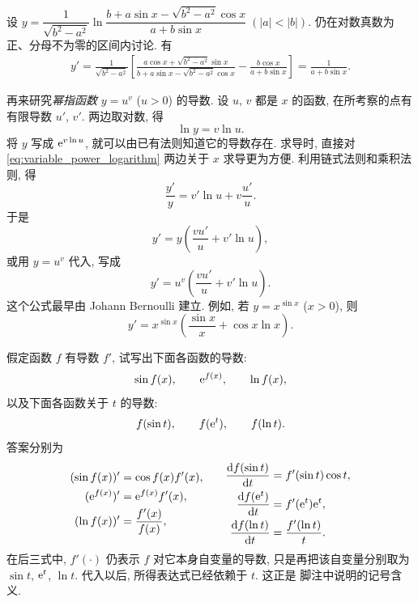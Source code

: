 \label{ex:differentiate_log_fractional_sine}
设
$
y=\dfrac1{\sqrt{b^2-a^2}}
\ln\dfrac{b+a\sin x-\sqrt{b^2-a^2}\cos x}{a+b\sin x}\; (|a|<|b|).
$
仍在对数真数为正、分母不为零的区间内讨论. 有
\begin{align*}
y'=\frac1{\sqrt{b^2-a^2}}\left[
\frac{a\cos x+\sqrt{b^2-a^2}\sin x}
{b+a\sin x-\sqrt{b^2-a^2}\cos x}
-\frac{b\cos x}{a+b\sin x}\right]
=\frac1{a+b\sin x}.
\end{align*}

\label{ex:differentiate_variable_power}
再来研究\emph{幂指函数}
 $y=u^v$ ($u>0$) 的导数.
设 $u$, $v$ 都是 $x$ 的函数, 在所考察的点有有限导数 $u'$, $v'$.
两边取对数, 得
\begin{equation}\label{eq:variable_power_logarithm}
\ln y=v\ln u.
\end{equation}
将 $y$ 写成 $\mathrm{e}^{v\ln u}$, 就可以由已有法则知道它的导数存在.
求导时, 直接对 \eqref{eq:variable_power_logarithm} 两边关于 $x$ 求导更为方便.
利用链式法则和乘积法则, 得
$$
\frac{y'}y=v'\ln u+v\frac{u'}u.
$$
于是
$$
y'=y\left(\frac{vu'}u+v'\ln u\right),
$$
或用 $y=u^v$ 代入, 写成
\begin{equation}\label{eq:variable_power_derivative}
y'=u^v\left(\frac{vu'}u+v'\ln u\right).
\end{equation}
这个公式最早由 Johann Bernoulli 建立.
例如, 若 $y=x^{\sin x}$ ($x>0$), 则
$$
y'=x^{\sin x}\left(\frac{\sin x}x+\cos x\ln x\right).
$$

\par\endgroup
\newpage

\label{ex:differentiate_compositions_with_unspecified_function}
假定函数 $f$ 有导数 $f'$, 试写出下面各函数的导数:
$$
\sin f(x),\qquad \mathrm{e}^{f(x)},\qquad \ln f(x),
$$
以及下面各函数关于 $t$ 的导数:
$$
f(\sin t),\qquad f(\mathrm{e}^t),\qquad f(\ln t).
$$
答案分别为
$$
\begin{aligned}
(\sin f(x))'&=\cos f(x)f'(x),\\
(\mathrm{e}^{f(x)})'&=\mathrm{e}^{f(x)}f'(x),\\
(\ln f(x))'&=\frac{f'(x)}{f(x)},
\end{aligned}
\qquad
\begin{aligned}
\frac{\mathrm{d} f(\sin t)}{\mathrm{d} t}&=f'(\sin t)\cos t,\\
\frac{\mathrm{d} f(\mathrm{e}^t)}{\mathrm{d} t}&=f'(\mathrm{e}^t)\mathrm{e}^t,\\
\frac{\mathrm{d} f(\ln t)}{\mathrm{d} t}&=\frac{f'(\ln t)}t.
\end{aligned}
$$
在后三式中, $f'(\cdot)$ 仍表示 $f$ 对它本身自变量的导数,
只是再把该自变量分别取为 $\sin t$, $\mathrm{e}^t$, $\ln t$.
代入以后, 所得表达式已经依赖于 $t$.
这正是  脚注中说明的记号含义.

